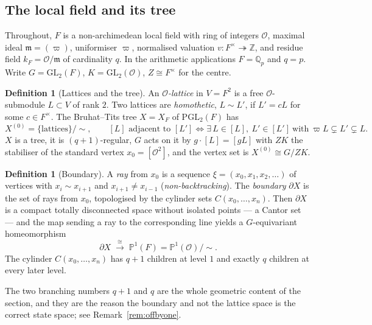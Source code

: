 \documentclass[11pt]{amsart}
\numberwithin{equation}{section}
\theoremstyle{definition}
\newtheorem{definition}[theorem]{Definition}
\theoremstyle{remark}
\newcommand{\Z}{\mathbb{Z}}
\newcommand{\Q}{\mathbb{Q}}
\newcommand{\PPone}{\mathbb{P}^1}
\newcommand{\cO}{\mathcal{O}}
\newcommand{\GL}{\mathrm{GL}}
\newcommand{\PGL}{\mathrm{PGL}}
\begin{document}
\subsection{The local field and its tree}

Throughout, $F$ is a non-archimedean local field with ring of integers $\cO$, maximal
ideal $\mathfrak{m}=(\varpi)$, uniformiser $\varpi$, normalised valuation
$v\colon F^\times\twoheadrightarrow\Z$, and residue field $k_F=\cO/\mathfrak{m}$ of
cardinality $q$. In the arithmetic applications $F=\Q_p$ and $q=p$. Write
$G=\GL_2(F)$, $K=\GL_2(\cO)$, $Z\cong F^\times$ for the centre.

\begin{definition}[Lattices and the tree]\label{def:tree}
An \emph{$\cO$-lattice} in $V=F^2$ is a free $\cO$-submodule $L\subset V$ of rank $2$.
Two lattices are \emph{homothetic}, $L\sim L'$, if $L'=cL$ for some $c\in F^\times$. The
Bruhat--Tits tree $X=X_F$ of $\PGL_2(F)$ has
\[
X^{(0)}=\{\text{lattices}\}/\!\sim,\qquad
[L]\text{ adjacent to }[L']\iff\exists\,L\in[L],\ L'\in[L']\ \text{with}\
\varpi L\subsetneq L'\subsetneq L .
\]
$X$ is a tree, it is $(q+1)$-regular, $G$ acts on it by $g\cdot[L]=[gL]$ with $Z K$ the
stabiliser of the standard vertex $x_0=[\cO^2]$, and the vertex set is
$X^{(0)}\cong G/ZK$.
\end{definition}

\begin{definition}[Boundary]\label{def:boundary}
A \emph{ray} from $x_0$ is a sequence $\xi=(x_0,x_1,x_2,\dots)$ of vertices with
$x_i\sim x_{i+1}$ and $x_{i+1}\neq x_{i-1}$ (\emph{non-backtracking}). The
\emph{boundary} $\partial X$ is the set of rays from $x_0$, topologised by the cylinder
sets $C(x_0,\dots,x_n)$. Then $\partial X$ is a compact totally disconnected space
without isolated points --- a Cantor set --- and the map sending a ray to the
corresponding line yields a $G$-equivariant homeomorphism
\[
\partial X\;\xrightarrow{\ \cong\ }\;\PPone(F)=\PPone(\cO)/\!\sim .
\]
The cylinder $C(x_0,\dots,x_n)$ has $q+1$ children at level $1$ and exactly $q$ children
at every later level.
\end{definition}

The two branching numbers $q+1$ and $q$ are the whole geometric content of the section,
and they are the reason the boundary and not the lattice space is the correct state
space; see Remark~\ref{rem:offbyone}.
\end{document}
